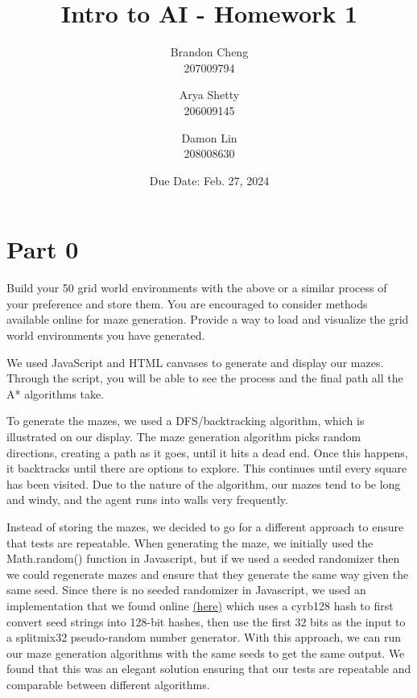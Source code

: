 \documentclass{article}
\title{Intro to AI - Homework 1}
\author{Brandon Cheng\\
        207009794
        \and
        Arya Shetty\\
        206009145
        \and
        Damon Lin\\
        208008630
        }
\date{Due Date: Feb. 27, 2024}
\begin{document}
\maketitle

\newpage

\section*{Part 0}
Build your 50 grid world environments with the above or a similar process of your preference and store them. You are encouraged to consider methods available online for maze generation. Provide a way to load and visualize the grid world environments you have generated.

{\color{blue} We used JavaScript and HTML canvases to generate and display our mazes. Through the script, you will be able to see the process and the final path all the A* algorithms take.

To generate the mazes, we used a DFS/backtracking algorithm, which is illustrated on our display. The maze generation algorithm picks random directions, creating a path as it goes, until it hits a dead end. Once this happens, it backtracks until there are options to explore. This continues until every square has been visited. Due to the nature of the algorithm, our mazes tend to be long and windy, and the agent runs into walls very frequently.

Instead of storing the mazes, we decided to go for a different approach to ensure that tests are repeatable. When generating the maze, we initially used the Math.random() function in Javascript, but if we used a seeded randomizer then we could regenerate mazes and ensure that they generate the same way given the same seed. Since there is no seeded randomizer in Javascript, we used an implementation that we found online \href{https://stackoverflow.com/questions/521295/seeding-the-random-number-generator-in-javascript}{(here)}  which uses a cyrb128 hash to first convert seed strings into 128-bit hashes, then use the first 32 bits as the input to a splitmix32 pseudo-random number generator. With this approach, we can run our maze generation algorithms with the same seeds to get the same output. We found that this was an elegant solution ensuring that our tests are repeatable and comparable between different algorithms.
}
\end{document}
